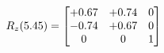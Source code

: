 \documentclass[preview]{standalone}
\begin{document}
\begin{align*}
\special{dvisvgm:raw <g id='unique000'>}R_{z}(5.45) = \begin{bmatrix}+0.67 & +0.74 & 0 \\-0.74 & +0.67 & 0 \\0 & 0 & 1\end{bmatrix}\special{dvisvgm:raw </g>}
\end{align*}
\end{document}
